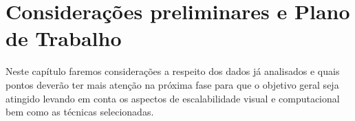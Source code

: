 \chapter{Considerações preliminares e Plano de Trabalho}
\label{cap:plano-de-trabalho}

Neste capítulo faremos considerações a respeito dos dados já analisados e quais
pontos deverão ter mais atenção na próxima fase para que o objetivo geral seja atingido
levando em conta os aspectos de escalabilidade visual e computacional bem como as técnicas
selecionadas.

